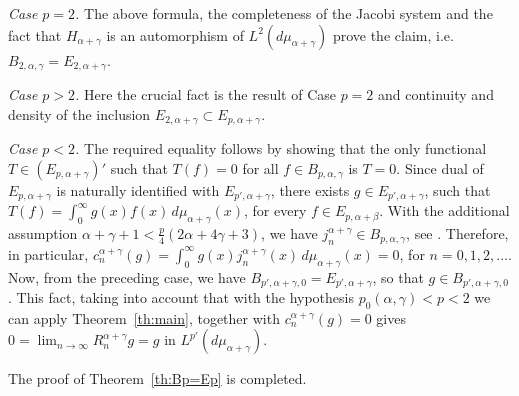 \documentclass[a4paper]{amsart}
\newcommand{\muag}{d\mu_{\alpha+\gamma}}
\begin{document}
\textit{Case $p=2$.}
The above formula, the completeness of the Jacobi system and the fact that
$H_{\alpha+\gamma}$ is an automorphism of $L^2(\muag)$ prove the claim,
i.e.~$B_{2,\alpha,\gamma} = E_{2,\alpha+\gamma}$.

\textit{Case $p>2$.} Here the crucial fact is the result of {Case $p=2$} and
continuity and density of the inclusion
$E_{2,\alpha+\gamma} \subset E_{p,\alpha+\gamma}$.

\textit{Case $p<2$.} The required
equality follows by showing that the only
functional $T\in(E_{p,\alpha+\gamma})'$ such that $T(f)=0$ for all
$f\in B_{p,\alpha,\gamma}$ is
$T=0$. Since dual of $E_{p,\alpha+\gamma}$ is naturally
identified with $E_{p',\alpha+\gamma}$,
there exists $g\in E_{p',\alpha+\gamma}$, such that
$T(f) = \int_0^\infty g(x)f(x)\,\muag(x)$, for every
$f\in E_{p,\alpha+\beta}$. With the additional assumption
$\alpha+\gamma+1 < \frac{p}4(2\alpha+4\gamma+3)$, we have
$j_n^{\alpha+\gamma} \in B_{p,\alpha,\gamma}$,
see \cite[Lemma~2]{CiGPV}. Therefore, in particular,
$c_n^{\alpha+\gamma}(g)
= \int_0^\infty g(x)j_n^{\alpha+\gamma}(x)\,\muag(x)=0$,
for $n=0,1,2,\dots$. Now, from the preceding case, we have
$B_{p',\alpha+\gamma,0} = E_{p',\alpha+\gamma}$,
so that $g\in B_{p',\alpha+\gamma,0}$. This
fact, taking into account that with the hypothesis
$p_0(\alpha,\gamma)<p<2$ we can apply Theorem~\ref{th:main},
together with $c_n^{\alpha+\gamma}(g) = 0$ gives
$0 = \lim_{n\to\infty}R_n^{\alpha+\gamma}g = g$
in $L^{p'}(\muag)$.

The proof of Theorem~\ref{th:Bp=Ep} is completed.
\end{document}
